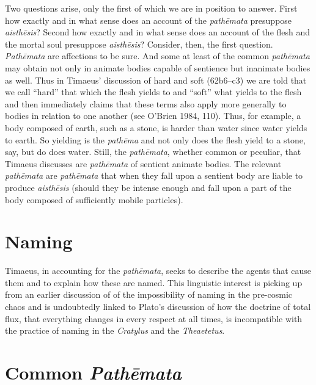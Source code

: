 Two questions arise, only the first of which we are in position to answer. First how exactly and in what sense does an account of the \emph{pathēmata} presuppose \emph{aisthēsis}? Second how exactly and in what sense does an account of the flesh and the mortal soul presuppose \emph{aisthēsis}? Consider, then, the first question. \emph{Pathēmata} are affections to be sure. And some at least of the common \emph{pathēmata} may obtain not only in animate bodies capable of sentience but inanimate bodies as well. Thus in Timaeus' discussion of hard and soft (62b6--c3) we are told that we call ``hard'' that which the flesh yields to and ``soft'' what yields to the flesh and then immediately claims that these terms also apply more generally to bodies in relation to one another (see O'Brien 1984, 110). Thus, for example, a body composed of earth, such as a stone, is harder than water since water yields to earth. So yielding is the \emph{pathēma} and not only does the flesh yield to a stone, say, but do does water. Still, the \emph{pathēmata}, whether common or peculiar, that Timaeus discusses are \emph{pathēmata} of sentient animate bodies. The relevant \emph{pathēmata} are \emph{pathēmata} that when they fall upon a sentient body are liable to produce \emph{aisthēsis} (should they be intense enough and fall upon a part of the body composed of sufficiently mobile particles). 


\section{Naming} %
\label{sec:naming}

Timaeus, in accounting for the \emph{pathēmata}, seeks to describe the agents that cause them and to explain how these are named. This linguistic interest is picking up from an earlier discussion of of the impossibility of naming in the pre-cosmic chaos and is undoubtedly linked to Plato's discussion of how the doctrine of total flux, that everything changes in every respect at all times, is incompatible with the practice of naming in the \emph{Cratylus} and the \emph{Theaetetus}.


\section{Common \emph{Pathēmata}} %
\label{sec:common_emph_pathemata}

